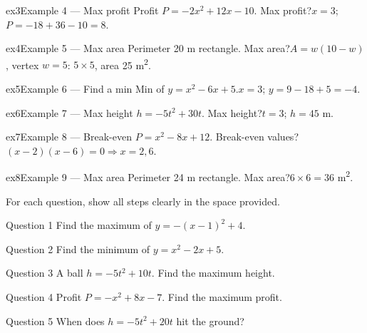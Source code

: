 \documentclass[11pt]{article}
\begin{document}
\begin{example}{ex3}{Example 4 --- Max profit}
Profit $P=-2x^2+12x-10$. Max profit?\soln $x=3$; $P=-18+36-10=8$.
\end{example}

\begin{example}{ex4}{Example 5 --- Max area}
Perimeter 20 m rectangle. Max area?\soln $A=w(10-w)$, vertex $w=5$: $5\times5$, area 25 m\textsuperscript{2}.
\end{example}

\begin{example}{ex5}{Example 6 --- Find a min}
Min of $y=x^2-6x+5$.\soln $x=3$; $y=9-18+5=-4$.
\end{example}

\begin{example}{ex6}{Example 7 --- Max height}
$h=-5t^2+30t$. Max height?\soln $t=3$; $h=45$ m.
\end{example}

\begin{example}{ex7}{Example 8 --- Break-even}
$P=x^2-8x+12$. Break-even values?\soln $(x-2)(x-6)=0\Rightarrow x=2,6$.
\end{example}

\begin{example}{ex8}{Example 9 --- Max area}
Perimeter 24 m rectangle. Max area?\soln $6\times6=36$ m\textsuperscript{2}.
\end{example}

\clearpage
{}
For each question, show all steps clearly in the space provided.

\begin{qbox}{Question 1}
Find the maximum of $y=-(x-1)^2+4$.\workspace{2.4cm}
\end{qbox}

\begin{qbox}{Question 2}
Find the minimum of $y=x^2-2x+5$.\workspace{2.4cm}
\end{qbox}

\begin{qbox}{Question 3}
A ball $h=-5t^2+10t$. Find the maximum height.\workspace{2.4cm}
\end{qbox}

\begin{qbox}{Question 4}
Profit $P=-x^2+8x-7$. Find the maximum profit.\workspace{2.4cm}
\end{qbox}

\begin{qbox}{Question 5}
When does $h=-5t^2+20t$ hit the ground?\workspace{2.4cm}
\end{qbox}
\end{document}
